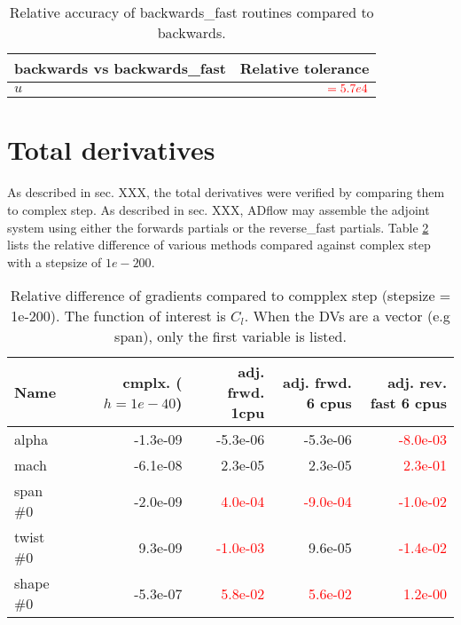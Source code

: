 \begin{table}[H]
    \centering
    \begin{tabular}{l r}
        \toprule
        backwards vs backwards\_fast        & Relative tolerance \\
        \toprule
        $u$                                 & $\textcolor{red}{= 5.7e4}$ \\
        \bottomrule
    \end{tabular}
    \caption{Relative accuracy of backwards\_fast routines compared to
    backwards.}
    \label{tab:partials_fast}
\end{table}







\section{Total derivatives}
As described in sec. XXX, the total derivatives were verified by comparing them
to complex step. As described in sec. XXX, ADflow may assemble the adjoint
system using either the forwards partials or the reverse\_fast partials. Table
\ref{tab:total_derivs} lists the relative difference of various methods
compared against complex step with a stepsize of $1e-200$.

\begin{table}[H]
    \centering
    \begin{tabular}{l r r r r}
        \toprule
        Name        & cmplx. ($h=1e-40$)   & adj. frwd. 1cpu           & 
            adj. frwd. 6 cpus         & adj. rev. fast 6 cpus    \\
        \toprule
        alpha       & -1.3e-09             & -5.3e-06                  & 
            -5.3e-06                  & \textcolor{red}{-8.0e-03} \\
        mach        & -6.1e-08             &  2.3e-05                  &  
            2.3e-05                  & \textcolor{red}{ 2.3e-01} \\
        \midrule
        span \#0    & -2.0e-09             &\textcolor{red}{ 4.0e-04}  &
            \textcolor{red}{-9.0e-04}  & \textcolor{red}{-1.0e-02} \\        
        twist \#0   &  9.3e-09             &\textcolor{red}{-1.0e-03}  &
            9.6e-05                    & \textcolor{red}{-1.4e-02} \\        
        shape \#0   & -5.3e-07             &\textcolor{red}{ 5.8e-02}  &
            \textcolor{red}{ 5.6e-02}  & \textcolor{red}{ 1.2e-00} \\         
        \bottomrule
    \end{tabular}
    \caption{Relative difference of gradients compared to compplex step
    (stepsize = 1e-200). The function of interest is $C_l$. When the DVs are a
    vector (e.g span), only the first variable is listed.}
    \label{tab:total_derivs}
\end{table}

